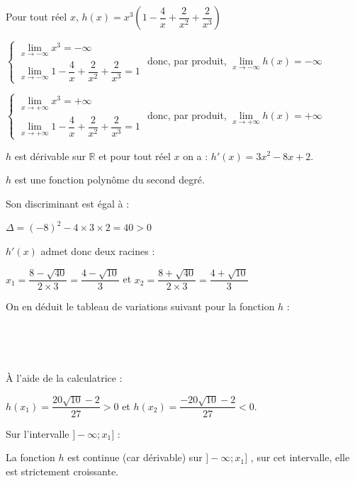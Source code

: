 \documentclass[10pt]{article}
\providecommand{\R}{\mathbb{R}}
\begin{document}
\begin{enumerate}
		Pour tout réel $x$, $h(x) = x^3 \left(1 - \dfrac{4}{x} + \dfrac{2}{x^2} +\dfrac{2}{x^3}\right)$

		\medskip
		$\begin{cases}
			\lim\limits_{x \to -\infty} x^3 = -\infty \\
			\lim\limits_{x \to -\infty }1 - \dfrac{4}{x} + \dfrac{2}{x^2} +\dfrac{2}{x^3} = 1
		\end{cases}$ donc, par produit, $\lim\limits_{x \to -\infty} h(x) =-\infty$

		\medskip
		$\begin{cases}
			\lim\limits_{x \to +\infty} x^3 = +\infty \\
			\lim\limits_{x \to +\infty }1 - \dfrac{4}{x} + \dfrac{2}{x^2} +\dfrac{2}{x^3} = 1
		\end{cases}$ donc, par produit, $\lim\limits_{x \to +\infty} h(x) =+\infty$

		\bigskip
		$h$ est dérivable sur $\R$ et pour tout réel $x$ on a : \quad $h'(x) = 3x^2 -8x +2$.

		$h$ est une fonction polynôme du second degré.

		Son discriminant est égal à :

		$\Delta = (-8)^2-4 \times 3 \times 2 = 40 >0$

		$h'(x)$  admet donc deux racines :

		\hfill $x_1 = \dfrac { 8 -\sqrt{40}}{2 \times3} = \dfrac{4- \sqrt{10}}{3}$ \hfill et \hfill  $x_2 = \dfrac { 8 +\sqrt{40}}{2 \times3} = \dfrac{4+ \sqrt{10}}{3}$\hfill~

		On en déduit le tableau de variations suivant pour la fonction $h$ :

		\hfill~
		\hfill~

		À l'aide de la calculatrice :

		\quad $h(x_1) = \dfrac{20\sqrt{10}-2}{27}   >0$  \quad et \quad $h(x_2) =\dfrac{-20\sqrt{10}-2}{27}  <0$.

		\bigskip

		Sur l'intervalle $]-\infty ; x_1]$ :

		La fonction $h$ est continue (car dérivable) sur $]-\infty ; x_1]$ , sur cet intervalle, elle est strictement croissante.


\end{enumerate}
\end{document}
